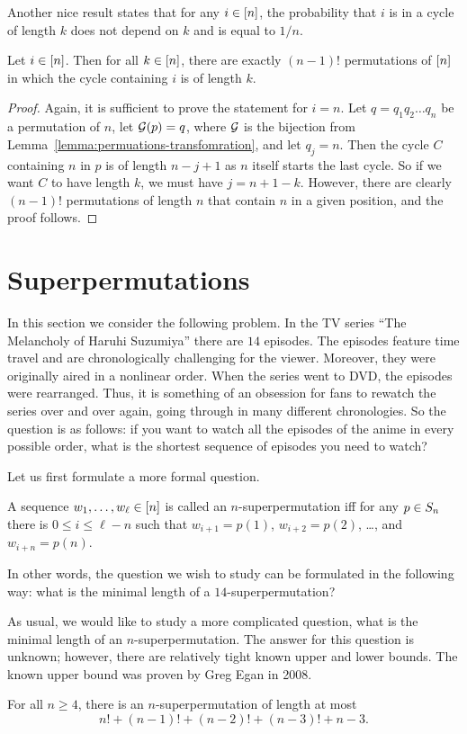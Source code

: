 Another nice result states that for any $i \in {[{n}]}$, the probability that
$i$ is in a cycle of length $k$ does not depend on $k$ and is equal to $1 / n$.
\begin{theorem}
  Let $i \in {[{n}]}$. Then for all $k \in {[{n}]}$, there are exactly $(n - 1)!$
  permutations of ${[{n}]}$ in which the cycle containing $i$ is of length $k$.
\end{theorem}
\begin{proof}
  Again, it is sufficient to prove the statement for $i = n$. Let
  $q = q_1 q_2 \dots q_n$ be a permutation of $n$, let $\mathcal{G}(p) = q$, where
  $\mathcal{G}$ is the bijection from Lemma~\ref{lemma:permuations-transfomration},
  and let  $q_j = n$. Then the cycle $C$ containing $n$ in $p$ is of length
  $n - j + 1$ as $n$ itself starts the last cycle. So if we want $C$ to have
  length $k$, we must have $j = n + 1 - k$. However, there are clearly
  $(n - 1)!$ permutations of length $n$ that contain $n$ in a given position,
  and the proof follows.
\end{proof}

\section{Superpermutations}
In this section we consider the following problem. In the TV series ``The
Melancholy of Haruhi Suzumiya'' there are $14$ episodes. The episodes feature
time travel and are chronologically challenging for the viewer. Moreover,
they were originally aired in a nonlinear order. When the series went to DVD,
the episodes were rearranged. Thus, it is something of an obsession for fans to
rewatch the series over and over again, going through in many different
chronologies. So the question is as follows: if you want to watch all the
episodes of the anime in every possible order, what is the shortest sequence of
episodes you need to watch?

Let us first formulate a more formal question.
\begin{definition}
  A sequence $w_1, \dots, w_\ell \in {[{n}]}$ is called an $n$-superpermutation iff
  for any $p \in S_{n}$ there is $0 \le i \le \ell - n$ such that
  $w_{i + 1} = p(1)$, $w_{i + 2} = p(2)$, \dots, and $w_{i + n} = p(n)$.
\end{definition}
In other words, the question we wish to study can be formulated in the
following way: what is the minimal length of a $14$-superpermutation?

As usual, we would like to study a more complicated question, what is the
minimal length of an $n$-superpermutation. The answer for this question is
unknown; however, there are relatively tight known upper and lower bounds. The
known upper bound was proven by Greg Egan in 2008.
\begin{theorem}
  For all $n \ge 4$, there is an $n$-superpermutation of length at most
  \[
    n! + (n - 1)! + (n - 2)! + (n - 3)! + n - 3.
  \]
\end{theorem}

